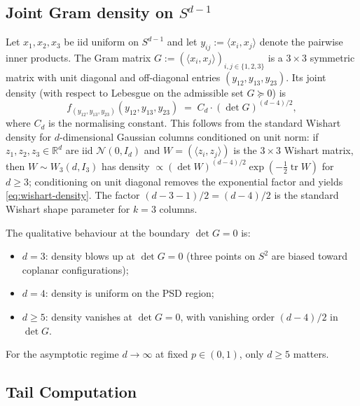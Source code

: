 \documentclass[reqno,12pt]{amsart}
\theoremstyle{plain}
\theoremstyle{definition}
\theoremstyle{remark}
\begin{document}
\subsection{Joint Gram density on \texorpdfstring{$S^{d-1}$}{S\^{}d-1}}\label{app:wishart-density}

Let $x_1, x_2, x_3$ be iid uniform on $S^{d-1}$ and let $y_{ij} := \langle x_i, x_j \rangle$
denote the pairwise inner products. The Gram matrix
$G := (\langle x_i, x_j \rangle)_{i,j \in \{1,2,3\}}$
is a $3 \times 3$ symmetric matrix with unit diagonal and off-diagonal entries
$(y_{12}, y_{13}, y_{23})$. Its joint density (with respect to Lebesgue on the
admissible set $G \succeq 0$) is
\begin{equation}\label{eq:wishart-density}
  f_{(y_{12}, y_{13}, y_{23})}(y_{12}, y_{13}, y_{23})
  \;=\; C_d \cdot (\det G)^{(d-4)/2},
\end{equation}
where $C_d$ is the normalising constant. This follows from the standard Wishart
density for $d$-dimensional Gaussian columns conditioned on unit norm: if
$z_1, z_2, z_3 \in \mathbb R^d$ are iid $\mathcal N(0, I_d)$ and $W = (\langle z_i, z_j \rangle)$
is the $3 \times 3$ Wishart matrix, then $W \sim W_3(d, I_3)$ has density
$\propto (\det W)^{(d-4)/2} \exp(-\tfrac12 \operatorname{tr} W)$ for $d \ge 3$; conditioning on
unit diagonal removes the exponential factor and yields \eqref{eq:wishart-density}.
The factor $(d-3-1)/2 = (d-4)/2$ is the standard Wishart shape parameter for $k = 3$
columns.

The qualitative behaviour at the boundary $\det G = 0$ is:
\begin{itemize}
  \item $d = 3$: density blows up at $\det G = 0$ (three points on $S^2$ are
        biased toward coplanar configurations);
  \item $d = 4$: density is uniform on the PSD region;
  \item $d \ge 5$: density vanishes at $\det G = 0$, with vanishing order
        $(d-4)/2$ in $\det G$.
\end{itemize}
For the asymptotic regime $d \to \infty$ at fixed $p \in (0, 1)$, only $d \ge 5$
matters.

\subsection{Tail Computation}\label{app:wishart-tail}
\end{document}

